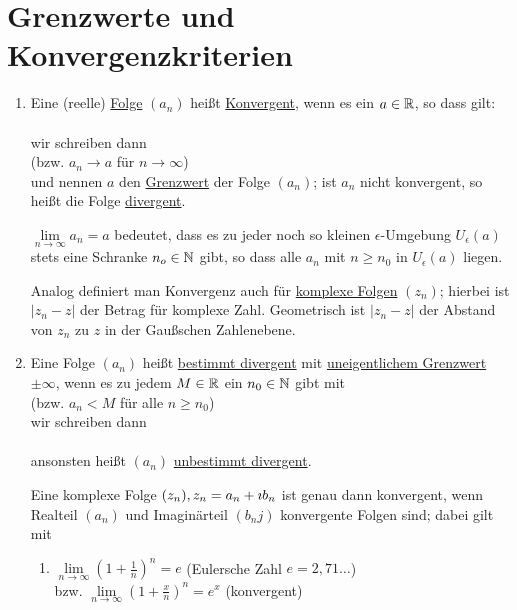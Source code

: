 \section{Grenzwerte und Konvergenzkriterien}
\Def
\begin{enumerate}
	\item Eine (reelle) \ul{Folge} $(a_n)$ heißt \ul{Konvergent}, wenn es ein $a\in\mathbb{R}$, so dass gilt:\\
	\\
	wir schreiben dann\\
	 \quad (bzw. $a_n\to a$ für $n\to\infty$)\\
	und nennen $a$ den \ul{Grenzwert} der Folge $(a_n)$; ist $a_n$ nicht konvergent, so heißt die Folge \ul{divergent}.
	
	\clearpage
	$\lim\limits_{n\to\infty}a_n=a$ bedeutet, dass es zu jeder noch so kleinen $\epsilon$-Umgebung $U_\epsilon(a)$ stets eine Schranke $n_o\in\mathbb{N}$ gibt, so dass alle $a_n$ mit $n\ge n_0$ in $U_\epsilon(a)$ liegen.
	
	Analog definiert man Konvergenz auch für \ul{komplexe Folgen} $(z_n)$; hierbei ist $|z_n-z|$ der Betrag für komplexe Zahl. Geometrisch ist $|z_n-z|$ der Abstand von $z_n$ zu $z$ in der Gaußschen Zahlenebene.
	
	\item Eine Folge $(a_n)$ heißt \ul{bestimmt divergent} mit \ul{uneigentlichem Grenzwert} $\pm\infty$, wenn es zu jedem $M\in\mathbb{R}$ ein $n_0\in\mathbb{N}$ gibt mit\\
	\quad(bzw. $a_n < M$ für alle $n\ge n_0$)\\
	wir schreiben dann\\
	\\
	ansonsten heißt $(a_n)$ \ul{unbestimmt divergent}.
	
	\Bem Eine komplexe Folge $(z_n), z_n = a_n +\imath b_n$ ist genau dann konvergent, wenn Realteil $(a_n)$ und Imaginärteil $(b_nj)$ konvergente Folgen sind; dabei gilt\\
	 mit 
	
	\begin{enumerate}
		\item $\lim\limits_{n\to\infty}(1+\frac{1}{n})^n=e$ (Eulersche Zahl $e=2,71\ldots$)\\
		bzw. $\lim\limits_{n\to\infty}(1+\frac{x}{n})^n=e^x$ (konvergent)
		

\end{enumerate}
\end{enumerate}
